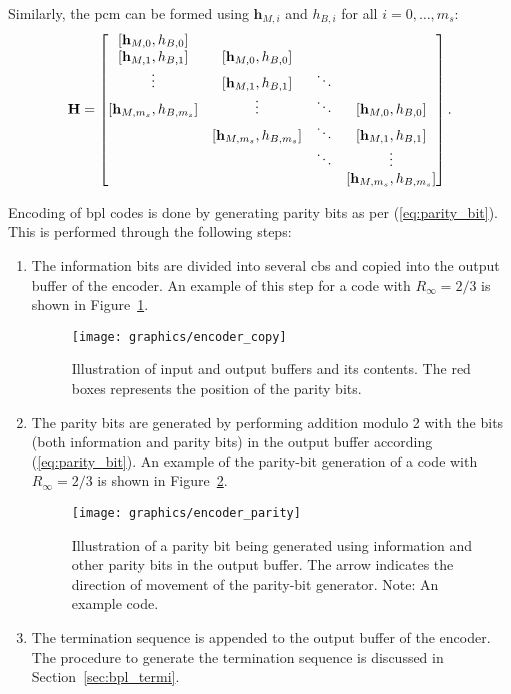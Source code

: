 Similarly, the \gls{pcm} can be formed using $\mathbf{h}_{M,i}$ and $h_{B,i}$ for all $i=0,\dots,m_s$:
\begin{align}\label{eq:bpl_pcm}
\mathbf{H}=
\begin{bmatrix}
[\mathbf{h}_{M,0},h_{B,0}]\\
[\mathbf{h}_{M,1},h_{B,1}] &[\mathbf{h}_{M,0},h_{B,0}]\\
\vdots &[\mathbf{h}_{M,1},h_{B,1}] &\ddots\\
[\mathbf{h}_{M,m_s},h_{B,m_s}] &\vdots &\ddots &[\mathbf{h}_{M,0},h_{B,0}]\\
&[\mathbf{h}_{M,m_s},h_{B,m_s}] &\ddots &[\mathbf{h}_{M,1},h_{B,1}]\\
& &\ddots &\vdots\\
& & &[\mathbf{h}_{M,m_s},h_{B,m_s}]
\end{bmatrix}.
\end{align}

Encoding of \gls{bpl} codes is done by generating parity bits as per (\ref{eq:parity_bit}). This is performed through the following steps:
\begin{enumerate}
  \item The information bits are divided into several \glspl{cb} and copied into the output buffer of the encoder. An example of this step for a code with $R_\infty=2/3$ is shown in Figure~\ref{fig:encode_copy}.
  \begin{figure}[htbp]
    \centering
    \texttt{[image: graphics/encoder\_copy]}
    \caption{Illustration of input and output buffers and its contents. The red boxes represents the position of the parity bits.}
    \label{fig:encode_copy}
  \end{figure}
  \item The parity bits are generated by performing addition modulo 2 with the bits (both information and parity bits) in the output buffer according (\ref{eq:parity_bit}). An example of the parity-bit generation of a code with  $R_\infty=2/3$ is shown in Figure~\ref{fig:encoder_paritygen}.
   \begin{figure}[htbp]
    \centering
    \texttt{[image: graphics/encoder\_parity]}
    \caption{Illustration of a parity bit being generated using information and other parity bits in the output buffer. The arrow indicates the direction of movement of the parity-bit generator. Note: An example code.}
    \label{fig:encoder_paritygen}
  \end{figure}
  \item The termination sequence is appended to the output buffer of the encoder. The procedure to generate the termination sequence is discussed in Section~\ref{sec:bpl_termi}.
\end{enumerate}

